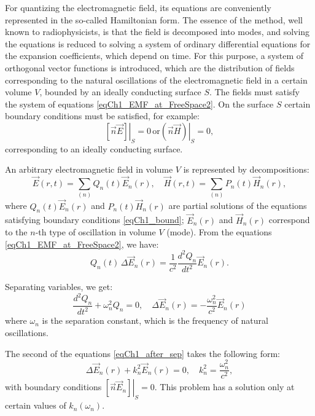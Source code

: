 For quantizing the electromagnetic field, its equations are conveniently represented in the so-called Hamiltonian form. The essence of the method, well known to radiophysicists, is that the field is decomposed into modes, and solving the equations is reduced to solving a system of ordinary differential equations for the expansion coefficients, which depend on time. For this purpose, a system of orthogonal vector functions is introduced, which are the distribution of fields corresponding to the natural oscillations of the electromagnetic field in a certain volume $V$, bounded by an ideally conducting surface $S$. The fields must satisfy the system of equations \eqref{eqCh1_EMF_at_FreeSpace2}. On the surface $S$ certain boundary conditions must be satisfied, for example:
\begin{equation}
\left. \left[ \vec{n} \vec{E} \right] \right|_S = 0 \,
\mbox{or}
\left. \left( \vec{n} \vec{H} \right) \right|_S = 0,
\label{eqCh1_bound}
\end{equation}
corresponding to an ideally conducting surface.

An arbitrary electromagnetic field in volume $V$ is represented by decompositions:
\begin{equation}
\vec{E}\left(r, t\right) = \sum_{(n)} Q_n\left(t\right)\vec{E}_n\left(r\right),
\quad
\vec{H}\left(r, t\right) = \sum_{(n)} P_n\left(t\right)\vec{H}_n\left(r\right),
\label{eqCh1_sep0}
\end{equation}
where $Q_n\left(t\right)\vec{E}_n\left(r\right)$ and 
$P_n\left(t\right)\vec{H}_n\left(r\right)$ are partial solutions of the equations satisfying boundary conditions \eqref{eqCh1_bound}; $\vec{E}_n\left(r\right)$ and  
$\vec{H}_n\left(r\right)$ correspond to the $n$-th type of oscillation in volume $V$ (mode).
From the equations \eqref{eqCh1_EMF_at_FreeSpace2}, we have:
\begin{equation}
Q_n\left(t\right) \, \Delta \vec{E}_n\left(r\right) = 
\frac{1}{c^2} \frac{d^2 Q_n}{d t^2}\vec{E}_n\left(r\right). 
\end{equation}

Separating variables, we get:
\begin{equation}
\frac{d^2 Q_n}{d t^2} + \omega_n^2 Q_n = 0,
\quad
\Delta \vec{E}_n \left(r\right) = - \frac{\omega_n^2}{c^2} 
\vec{E}_n \left(r\right)
\label{eqCh1_after_sep}
\end{equation}
where $\omega_n$ is the separation constant, which is the frequency of natural oscillations.

The second of the equations \eqref{eqCh1_after_sep} takes the following form:
\begin{equation}
\Delta \vec{E}_n\left(r\right) + k_n^2 \vec{E}_n\left(r\right) = 0,
\quad
k_n^2 = \frac{\omega_n^2}{c^2},
\end{equation}
with boundary conditions  
$\left. \left[ \vec{n} \vec{E}_n \right] \right|_S = 0$. This problem has a solution only at certain values of  
$k_n\left(\omega_n\right)$.

